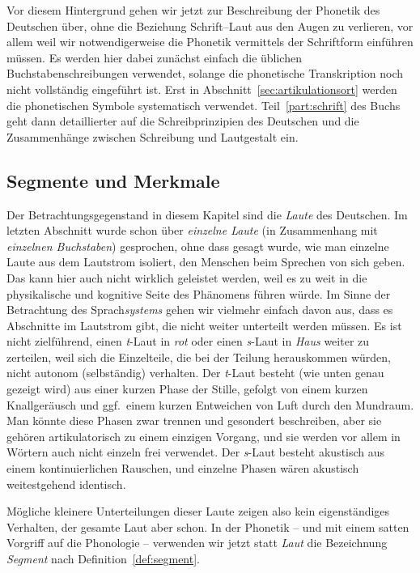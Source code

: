 Vor diesem Hintergrund gehen wir jetzt zur Beschreibung der Phonetik des Deutschen über, ohne die Beziehung Schrift--Laut aus den Augen zu verlieren, vor allem weil wir notwendigerweise die Phonetik vermittels der Schriftform einführen müssen.
Es werden hier dabei zunächst einfach die üblichen Buchstabenschreibungen verwendet, solange die phonetische Transkription noch nicht vollständig eingeführt ist.
Erst in Abschnitt~\ref{sec:artikulationsort} werden die phonetischen Symbole systematisch verwendet.
Teil~\ref{part:schrift} des Buchs geht dann detaillierter auf die Schreibprinzipien des Deutschen und die Zusammenhänge zwischen Schreibung und Lautgestalt ein.

\subsection{Segmente und Merkmale}

\label{sec:segmentemerkmale}

Der Betrachtungsgegenstand in diesem Kapitel sind die \textit{Laute} des Deutschen.
Im letzten Abschnitt wurde schon über \textit{einzelne Laute} (in Zusammenhang mit \textit{einzelnen Buchstaben}) gesprochen, ohne dass gesagt wurde, wie man einzelne Laute aus dem Lautstrom isoliert, den Menschen beim Sprechen von sich geben.
Das kann hier auch nicht wirklich geleistet werden, weil es zu weit in die physikalische und kognitive Seite des Phänomens führen würde.
Im Sinne der Betrachtung des Sprach\textit{systems} gehen wir vielmehr einfach davon aus, dass es Abschnitte im Lautstrom gibt, die nicht weiter unterteilt werden müssen.
Es ist \zB nicht zielführend, einen \textit{t}-Laut in \textit{rot} oder einen \textit{s}-Laut in \textit{Haus} weiter zu zerteilen, weil sich die Einzelteile, die bei der Teilung herauskommen würden, nicht autonom (selbständig) verhalten.
Der \textit{t}-Laut besteht (wie unten genau gezeigt wird) aus einer kurzen Phase der Stille, gefolgt von einem kurzen Knallgeräusch und ggf.\ einem kurzen Entweichen von Luft durch den Mundraum.
Man könnte diese Phasen zwar trennen und gesondert beschreiben, aber sie gehören artikulatorisch zu einem einzigen Vorgang, und sie werden vor allem in Wörtern auch nicht einzeln frei verwendet.
Der \textit{s}-Laut besteht akustisch aus einem kontinuierlichen Rauschen, und einzelne Phasen wären akustisch weitestgehend identisch.

Mögliche kleinere Unterteilungen dieser Laute zeigen also kein eigenständiges Verhalten, der gesamte Laut aber schon.
In der Phonetik -- und mit einem satten Vorgriff auf die Phonologie -- verwenden wir jetzt statt \textit{Laut} die Bezeichnung \textit{Segment} nach Definition~\ref{def:segment}.

